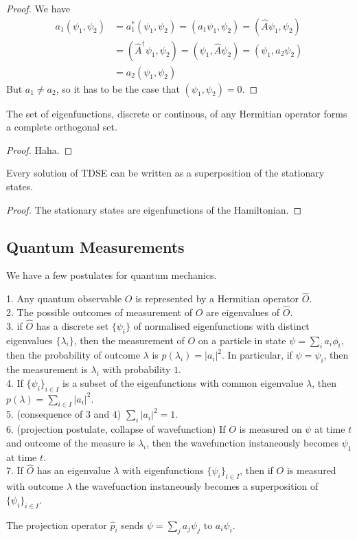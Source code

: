 \begin{proof}
    We have
    \begin{align*}
        a_1(\psi_1,\psi_2 )&=a_1^*(\psi_1,\psi_2)=( a_1\psi_1,\psi_2)=( \hat{A}\psi_1,\psi_2)\\
        &=( \hat{A}^\dagger\psi_1,\psi_2)=(\psi_1,\hat{A}\psi_2)=(\psi_1,a_2\psi_2)\\
        &=a_2(\psi_1,\psi_2)
    \end{align*}
    But $a_1\neq a_2$, so it has to be the case that $(\psi_1,\psi_2)=0$.
\end{proof}
\begin{theorem}
    The set of eigenfunctions, discrete or continous, of any Hermitian operator forms a complete orthogonal set.
\end{theorem}
\begin{proof}
    Haha.
\end{proof}
\begin{corollary}
    Every solution of TDSE can be written as a superposition of the stationary states.
\end{corollary}
\begin{proof}
    The stationary states are eigenfunctions of the Hamiltonian.
\end{proof}
\subsection{Quantum Measurements}
We have a few postulates for quantum mechanics.
\begin{postulate}
    1. Any quantum observable $O$ is represented by a Hermitian operator $\hat{O}$.\\
    2. The possible outcomes of measurement of $O$ are eigenvalues of $\hat{O}$.\\
    3. if $\hat{O}$ has a discrete set $\{\psi_i\}$ of normalised eigenfunctions with distinct eigenvalues $\{\lambda_i\}$, then the measurement of $O$ on a particle in state $\psi=\sum_ia_i\phi_i$, then the probability of outcome $\lambda$ is $p(\lambda_i)=|a_i|^2$.
    In particular, if $\psi=\psi_i$, then the measurement is $\lambda_i$ with probability $1$.\\
    4. If $\{\psi_i\}_{i\in I}$ is a subset of the eigenfunctions with common eigenvalue $\lambda$, then $p(\lambda)=\sum_{i\in I}|a_i|^2$.\\
    5. (consequence of 3 and 4) $\sum_i|a_i|^2=1$.\\
    6. (projection postulate, collapse of wavefunction) If $O$ is measured on $\psi$ at time $t$ and outcome of the measure is $\lambda_i$, then the wavefunction instaneously becomes $\psi_1$ at time $t$.\\
    7. If $\hat{O}$ has an eigenvalue $\lambda$ with eigenfunctions $\{\psi_i\}_{i\in I}$, then if $O$ is measured with outcome $\lambda$ the wavefunction instaneously becomes a superposition of $\{\psi_i\}_{i\in I}$.
\end{postulate}
\begin{definition}
    The projection operator $\hat{p}_i$ sends $\psi=\sum_ja_j\psi_j$ to $a_i\psi_i$.
\end{definition}
